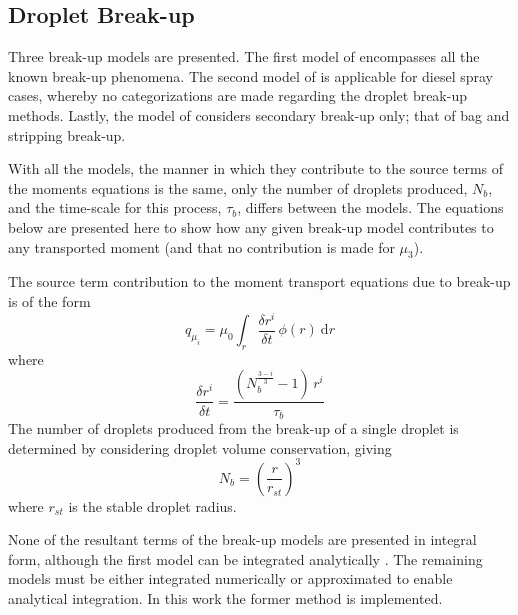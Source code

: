 \documentclass[a4paper,10pt]{article}
\begin{document}
\subsection{Droplet Break-up}
Three break-up models are presented.  The first model of \cite{pilch1987} encompasses all the known break-up phenomena.  The second model of \cite{hsiang1992} is applicable for diesel spray cases, whereby no categorizations are made regarding the droplet break-up methods.  Lastly, the model of \cite{reitz1986} considers secondary break-up only; that of bag and stripping break-up.

With all the models, the manner in which they contribute to the source terms of the moments equations is the same, only the number of droplets produced, $N_{b}$, and the time-scale for this process, $\tau_{b}$, differs between the models. The equations below are presented here to show how any given break-up model contributes to any transported moment (and that no contribution is made for $\mu_3$).

The source term contribution to the moment transport equations due to break-up is of the form
\begin{equation}
q_{\mu_i} = \mu_0 \int_r \frac{\delta r^i}{\delta t} \, \phi(r) \: \mathrm{d}r
\end{equation}
where
\begin{equation}
\frac{\delta r^i}{\delta t} = \frac{(N_{b}^{\frac{3-i}{3}}-1) \, r^i}{\tau_{b}}
\end{equation}
The number of droplets produced from the break-up of a single droplet is determined by considering droplet volume conservation, giving
\begin{equation}
N_b = \left(\frac{r}{r_{st}}\right)^3
\end{equation}
where $r_{st}$ is the stable droplet radius.

None of the resultant terms of the break-up models are presented in integral form, although the first model can be integrated analytically \cite{beck2002}.  The remaining models must be either integrated numerically or approximated to enable analytical integration. In this work the former method is implemented.
\end{document}
